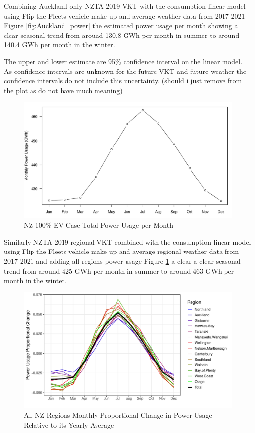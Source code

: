 \documentclass[
]{article}
\begin{document}
Combining Auckland only NZTA 2019 VKT with the consumption linear model
using Flip the Fleets vehicle make up and average weather data from
2017-2021 Figure \ref{fig:Auckland_power} the estimated power usage per
month showing a clear seasonal trend from around 130.8 GWh per month in
summer to around 140.4 GWh per month in the winter.

The upper and lower estimate are 95\% confidence interval on the linear
model. As confidence intervals are unknown for the future VKT and future
weather the confidence intervals do not include this uncertainty.
(should i just remove from the plot as do not have much meaning)

\begin{figure}
\centering
\includegraphics{final_report_files/figure-latex/NZ_power-1.pdf}
\caption{NZ 100\% EV Case Total Power Usage per
Month\label{fig:NZ_power}}
\end{figure}

Similarly NZTA 2019 regional VKT combined with the consumption linear
model using Flip the Fleets vehicle make up and average regional weather
data from 2017-2021 and adding all regions power usage Figure
\ref{fig:NZ_power} a clear a clear seasonal trend from around 425 GWh
per month in summer to around 463 GWh per month in the winter.

\begin{figure}
\centering
\includegraphics{final_report_files/figure-latex/NZ_region_power_prop-1.pdf}
\caption{All NZ Regions Monthly Proportional Change in Power Usage
Relative to its Yearly Average\label{fig:NZ_region_power_prop}}
\end{figure}
\end{document}
